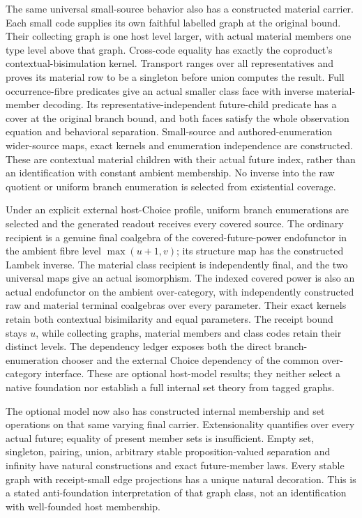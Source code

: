 \documentclass[11pt]{article}
\theoremstyle{definition}
\theoremstyle{remark}
\begin{document}
The same universal small-source behavior also has a constructed material
carrier.  Each small code supplies its own faithful labelled graph at the
original bound.  Their collecting graph is one host level larger, with actual
material members one type level above that graph.  Cross-code equality has
exactly the coproduct's contextual-bisimulation kernel.  Transport ranges
over all representatives and proves its material row to be a singleton
before union computes the result.  Full occurrence-fibre predicates give an
actual smaller class face with inverse material-member decoding.  Its
representative-independent future-child predicate has a cover at the original
branch bound, and both faces satisfy the whole observation equation and
behavioral separation.  Small-source and authored-enumeration wider-source
maps, exact kernels and enumeration independence are constructed.  These
are contextual material children with their actual future index, rather
than an identification with constant ambient membership.  No inverse into
the raw quotient or uniform branch enumeration is selected from existential
coverage.

Under an explicit external host-Choice profile, uniform branch
enumerations are selected and the generated readout receives every covered
source.  The ordinary recipient is a genuine final coalgebra of the
covered-future-power endofunctor in the ambient fibre level
\(\max(u+1,v)\); its structure map has the constructed Lambek inverse.
The material class recipient is independently final, and the two universal
maps give an actual isomorphism.  The indexed covered power is also an
actual endofunctor on the ambient over-category, with independently
constructed raw and material terminal coalgebras over every parameter.
Their exact kernels retain both contextual bisimilarity and equal
parameters.  The receipt bound stays \(u\), while collecting graphs,
material members and class codes retain their distinct levels.  The
dependency ledger exposes both the direct branch-enumeration chooser and
the external Choice dependency of the common over-category interface.
These are optional host-model results; they neither select a native
foundation nor establish a full internal set theory from tagged graphs.

The optional model now also has constructed internal membership and set
operations on that same varying final carrier. Extensionality quantifies
over every actual future; equality of present member sets is insufficient.
Empty set, singleton, pairing, union, arbitrary stable proposition-valued
separation and infinity have natural constructions and exact future-member
laws. Every stable graph with receipt-small edge projections has a unique
natural decoration. This is a stated anti-foundation interpretation of
that graph class, not an identification with well-founded host membership.
\end{document}

